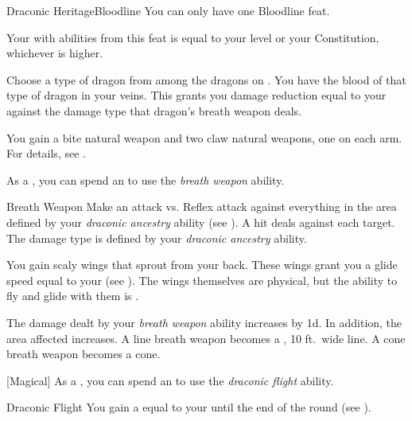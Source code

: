     \begin{feat}{Draconic Heritage}{Bloodline}
         You can only have one Bloodline feat.

         Your  with abilities from this feat is equal to your level or your Constitution, whichever is higher.

         Choose a type of dragon from among the dragons on .
        You have the blood of that type of dragon in your veins.
        This grants you damage reduction equal to your  against the damage type that dragon's breath weapon deals.

         You gain a bite natural weapon and two claw natural weapons, one on each arm.
        For details, see .

         As a , you can spend an  to use the \textit{breath weapon} ability.
        \begin{ability}{Breath Weapon}
            Make an attack vs. Reflex attack against everything in the area defined by your \textit{draconic ancestry} ability (see ).
            A hit deals  against each target.
            The damage type is defined by your \textit{draconic ancestry} ability.
        \end{ability}

         You gain scaly wings that sprout from your back.
        These wings grant you a glide speed equal to your  (see ).
        The wings themselves are physical, but the ability to fly and glide with them is .

         The damage dealt by your \textit{breath weapon} ability increases by \plus1d.
        In addition, the area affected increases.
        A line breath weapon becomes a \areahuge, 10 ft.\ wide line.
        A cone breath weapon becomes a \arealarge cone.

        [Magical] As a , you can spend an  to use the \textit{draconic flight} ability.
        \begin{ability}{Draconic Flight}
            You gain a  equal to your  until the end of the round (see ).
        \end{ability}


\end{feat}
